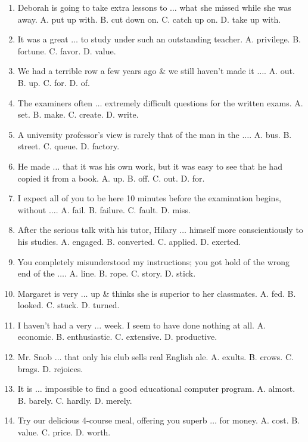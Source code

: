 \documentclass{article}
\numberwithin{equation}{section}
\begin{document}
\begin{enumerate}[leftmargin=8mm]
	\item Deborah is going to take extra lessons to $\ldots$ what she missed while she was away. {\sf A.} put up with. {\sf B.} cut down on. {\sf C.} catch up on. {\sf D.} take up with.
	\item It was a great $\ldots$ to study under such an outstanding teacher. {\sf A.} privilege. {\sf B.} fortune. {\sf C.} favor. {\sf D.} value.
	\item We had a terrible row a few years ago \& we still haven't made it $\ldots$. {\sf A.} out. {\sf B.} up. {\sf C.} for. {\sf D.} of.
	\item The examiners often $\ldots$ extremely difficult questions for the written exams. {\sf A.} set. {\sf B.} make. {\sf C.} create. {\sf D.} write.
	\item A university professor's view is rarely that of the man in the $\ldots$. {\sf A.} bus. {\sf B.} street. {\sf C.} queue. {\sf D.} factory.
	\item He made $\ldots$ that it was his own work, but it was easy to see that he had copied it from a book. {\sf A.} up. {\sf B.} off. {\sf C.} out. {\sf D.} for.
	\item I expect all of you to be here 10 minutes before the examination begins, without $\ldots$. {\sf A.} fail. {\sf B.} failure. {\sf C.} fault. {\sf D.} miss.
	\item After the serious talk with his tutor, Hilary $\ldots$ himself more conscientiously to his studies. {\sf A.} engaged. {\sf B.} converted. {\sf C.} applied. {\sf D.} exerted.
	\item You completely misunderstood my instructions; you got hold of the wrong end of the $\ldots$. {\sf A.} line. {\sf B.} rope. {\sf C.} story. {\sf D.} stick.
	\item Margaret is very $\ldots$ up \& thinks she is superior to her classmates. {\sf A.} fed. {\sf B.} looked. {\sf C.} stuck. {\sf D.} turned.
	\item I haven't had a very $\ldots$ week. I seem to have done nothing at all. {\sf A.} economic. {\sf B.} enthusiastic. {\sf C.} extensive. {\sf D.} productive.
	\item Mr. Snob $\ldots$ that only his club sells real English ale. {\sf A.} exults. {\sf B.} crows. {\sf C.} brags. {\sf D.} rejoices.
	\item It is $\ldots$ impossible to find a good educational computer program. {\sf A.} almost. {\sf B.} barely. {\sf C.} hardly. {\sf D.} merely.
	\item Try our delicious 4-course meal, offering you superb $\ldots$ for money. {\sf A.} cost. {\sf B.} value. {\sf C.} price. {\sf D.} worth.

\end{enumerate}
\end{document}
